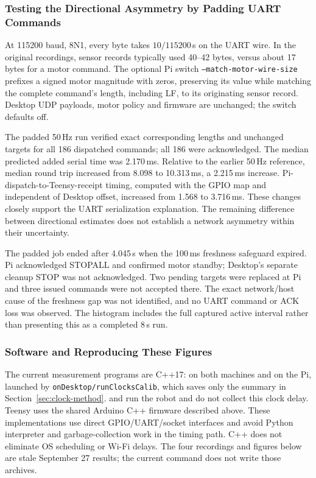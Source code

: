 \subsubsection{Testing the Directional Asymmetry by Padding UART Commands}
At 115200 baud, 8N1, every byte takes $10/115200$\,s on the UART wire. In the original recordings, sensor records typically used 40--42 bytes, versus about 17 bytes for a motor command. The optional Pi switch \texttt{--match-motor-wire-size} prefixes a signed motor magnitude with zeros, preserving its value while matching the complete command's length, including LF, to its originating sensor record. Desktop UDP payloads, motor policy and firmware are unchanged; the switch defaults off.

The padded 50\,Hz run verified exact corresponding lengths and unchanged targets for all 186 dispatched commands; all 186 were acknowledged. The median predicted added serial time was 2.170\,ms. Relative to the earlier 50\,Hz reference, median round trip increased from 8.098 to 10.313\,ms, a 2.215\,ms increase. Pi-dispatch-to-Teensy-receipt timing, computed with the GPIO map and independent of Desktop offset, increased from 1.568 to 3.716\,ms. These changes closely support the UART serialization explanation. The remaining difference between directional estimates does not establish a network asymmetry within their uncertainty.

The padded job ended after 4.045\,s when the 100\,ms freshness safeguard expired. Pi acknowledged STOPALL and confirmed motor standby; Desktop's separate cleanup STOP was not acknowledged. Two pending targets were replaced at Pi and three issued commands were not accepted there. The exact network/host cause of the freshness gap was not identified, and no UART command or ACK loss was observed. The histogram includes the full captured active interval rather than presenting this as a completed 8\,s run.

\subsubsection{Software and Reproducing These Figures}
\begin{sloppypar}
The current measurement programs are C++17:  on both machines and  on the Pi, launched by \texttt{onDesktop/runClocksCalib}, which saves only the summary in Section~\ref{sec:clock-method}.  and  run the robot and do not collect this clock delay. Teensy uses the shared Arduino C++ firmware described above. These implementations use direct GPIO/UART/socket interfaces and avoid Python interpreter and garbage-collection work in the timing path. C++ does not eliminate OS scheduling or Wi-Fi delays. The four recordings and figures below are stale September 27 results; the current command does not write those archives.
\end{sloppypar}

